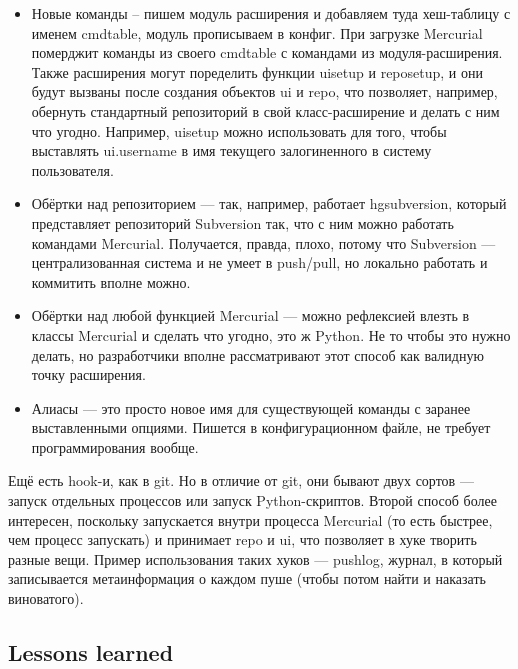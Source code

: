 \documentclass[a5paper]{article}
\begin{document}
\begin{itemize}
    \item Новые команды -- пишем модуль расширения и добавляем туда хеш-таблицу с именем cmdtable, модуль прописываем в конфиг. При загрузке Mercurial померджит команды из своего cmdtable с командами из модуля-расширения. Также расширения могут поределить функции uisetup и reposetup, и они будут вызваны после создания объектов ui и repo, что позволяет, например, обернуть стандартный репозиторий в свой класс-расширение и делать с ним что угодно. Например, uisetup можно использовать для того, чтобы выставлять ui.username в имя текущего залогиненного в систему пользователя.
    \item Обёртки над репозиторием --- так, например, работает hgsubversion, который представляет репозиторий Subversion так, что с ним можно работать командами Mercurial. Получается, правда, плохо, потому что Subversion --- централизованная система и не умеет в push/pull, но локально работать и коммитить вполне можно.
    \item Обёртки над любой функцией Mercurial --- можно рефлексией влезть в классы Mercurial и сделать что угодно, это ж Python. Не то чтобы это нужно делать, но разработчики вполне рассматривают этот способ как валидную точку расширения.
    \item Алиасы --- это просто новое имя для существующей команды с заранее выставленными опциями. Пишется в конфигурационном файле, не требует программирования вообще.
\end{itemize}

Ещё есть hook-и, как в git. Но в отличие от git, они бывают двух сортов --- запуск отдельных процессов или запуск Python-скриптов. Второй способ более интересен, поскольку запускается внутри процесса Mercurial (то есть быстрее, чем процесс запускать) и принимает repo и ui, что позволяет в хуке творить разные вещи. Пример использования таких хуков --- pushlog, журнал, в который записывается метаинформация о каждом пуше (чтобы потом найти и наказать виноватого).

\subsection{Lessons learned}
\end{document}
